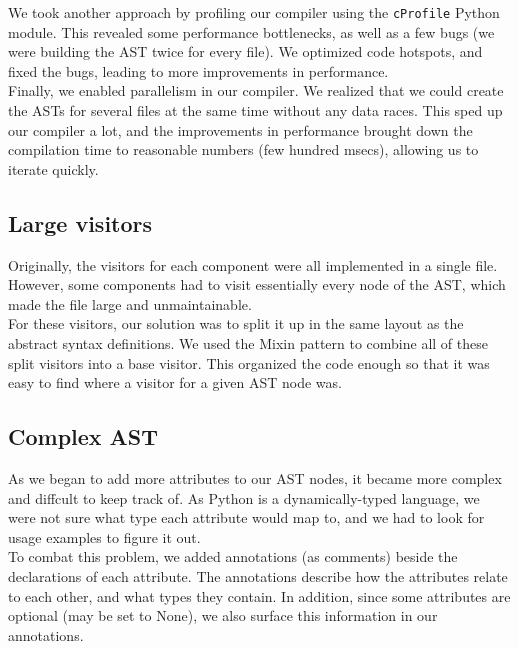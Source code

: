 \documentclass[12pt, a4paper]{article}
\begin{document}
We took another approach by profiling our compiler using the \verb|cProfile| Python module. This revealed some performance bottlenecks, as well as a few bugs (we were building the AST twice for every file). We optimized code hotspots, and fixed the bugs, leading to more improvements in performance. \\

Finally, we enabled parallelism in our compiler. We realized that we could create the ASTs for several files at the same time without any data races. This sped up our compiler a lot, and the improvements in performance brought down the compilation time to reasonable numbers (few hundred msecs), allowing us to iterate quickly.

\subsection{Large visitors}

Originally, the visitors for each component were all implemented in a single file. However, some components had to visit essentially every node of the AST, which made the file large and unmaintainable. \\

For these visitors, our solution was to split it up in the same layout as the abstract syntax definitions. We used the Mixin pattern to combine all of these split visitors into a base visitor. This organized the code enough so that it was easy to find where a visitor for a given AST node was.

\subsection{Complex AST}

As we began to add more attributes to our AST nodes, it became more complex and diffcult to keep track of. As Python is a dynamically-typed language, we were not sure what type each attribute would map to, and we had to look for usage examples to figure it out. \\

To combat this problem, we added annotations (as comments) beside the declarations of each attribute. The annotations describe how the attributes relate to each other, and what types they contain. In addition, since some attributes are optional (may be set to None), we also surface this information in our annotations. \\
\end{document}
